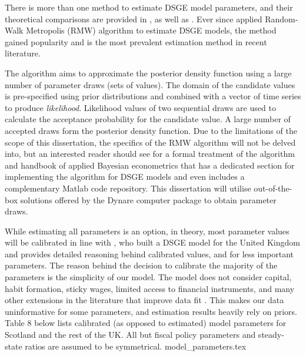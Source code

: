 There is more than one method to estimate DSGE model parameters, and their theoretical comparisons are provided in \textcite[123-130]{an_2007_bayesian}, as well as \textcite[109-110]{ricci_2019_essays}. Ever since \textcite{schorfheide_2000_loss} applied Random-Walk Metropolis (RMW) algorithm to estimate DSGE models, the method gained popularity and is the most prevalent estimation method in recent literature. 

The algorithm aims to approximate the posterior density function using a large number of parameter draws (sets of values). The domain of the candidate values is pre-specified using prior distributions and combined with a vector of time series to produce \textit{likelihood}. Likelihood values of two sequential draws are used to calculate the acceptance probability for the candidate value. A large number of accepted draws form the posterior density function. Due to the limitations of the scope of this dissertation, the specifics of the RMW algorithm will not be delved into, but an interested reader should see \textcite[131]{an_2007_bayesian} for a formal treatment of the algorithm and \textcite{blake_2017_applied} handbook of applied Bayesian econometrics that has a dedicated section for implementing the algorithm for DSGE models and even includes a complementary Matlab code repository. This dissertation will utilise out-of-the-box solutions offered by the Dynare computer package \parencite{adjemian_2021_dynare} to obtain parameter draws.

While estimating all parameters is an option, in theory, most parameter values will be calibrated in line with \textcite[41]{harrison_2010_evaluating}, who built a DSGE model for the United Kingdom and provides detailed reasoning behind calibrated values, and \textcites[67-75]{jordigal_2015_monetary}[3839]{gali_2005_monetary} for less important parameters. The reason behind the decision to calibrate the majority of the parameters is the simplicity of our model. The model does not consider capital, habit formation, sticky wages, limited access to financial instruments, and many other extensions in the literature that improve data fit \parencite{yagihashi_2020_dsge}. This makes our data uninformative for some parameters, and estimation results heavily rely on priors. Table 8 below lists calibrated (as opposed to estimated) model parameters for Scotland and the rest of the UK. All but fiscal policy parameters and steady-state ratios are assumed to be symmetrical. 
{model_parameters.tex}

